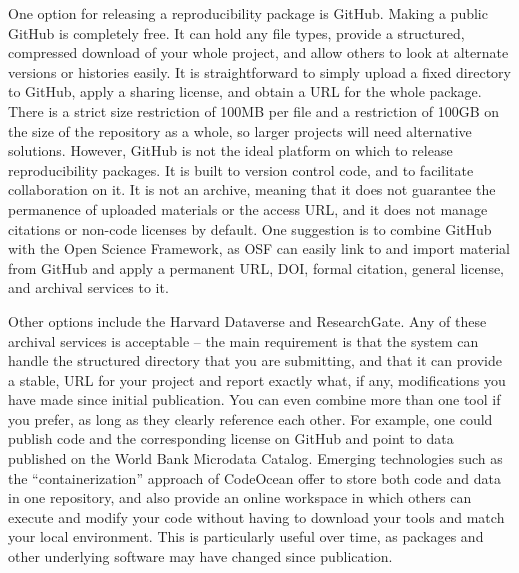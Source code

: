 One option for releasing a reproducibility package is GitHub.
Making a public GitHub is completely free.
It can hold any file types,
provide a structured, compressed download of your whole project,
and allow others to look at alternate versions or histories easily.
It is straightforward to simply upload a fixed directory to GitHub,
apply a sharing license, and obtain a URL for the whole package.
There is a strict size restriction of 100MB per file and
a restriction of 100GB on the size of the repository as a whole,
so larger projects will need alternative solutions.
However, GitHub is not the ideal platform on which to release reproducibility packages.
It is built to version control code, and to facilitate collaboration on it.
It is not an archive, meaning that it does not guarantee the permanence
of uploaded materials or the access URL,
and it does not manage citations or non-code licenses by default.
One suggestion is to combine GitHub with the Open Science Framework,
as OSF can easily link to and import material from GitHub and
apply a permanent URL, DOI, formal citation, general license, and archival services to it.

Other options include the Harvard Dataverse
and ResearchGate.
Any of these archival services is acceptable --
the main requirement is that the system can handle
the structured directory that you are submitting,
and that it can provide a stable, URL for your project
and report exactly what, if any,
modifications you have made since initial publication.
You can even combine more than one tool if you prefer,
as long as they clearly reference each other.
For example, one could publish code and the corresponding license on GitHub
and point to data published on the World Bank Microdata Catalog.
Emerging technologies such as the ``containerization'' approach of CodeOcean
offer to store both code and data in one repository,
and also provide an online workspace in which others can execute and modify your code
without having to download your tools and match your local environment.
This is particularly useful over time, as packages and other underlying software may have changed since publication.

